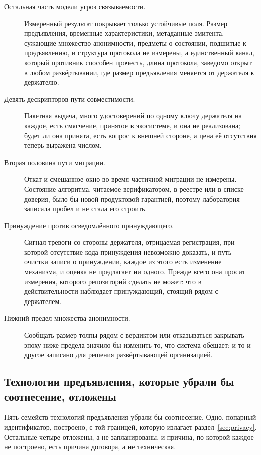 \begin{description}
  \item[Остальная часть модели угроз связываемости.] Измеренный результат покрывает только
    устойчивые поля. Размер предъявления, временные характеристики, метаданные эмитента, сужающие
    множество анонимности, предметы о состоянии, подшитые к предъявлению, и структура протокола не
    измерены, а единственный канал, который противник способен прочесть, длина протокола, заведомо
    открыт в любом развёртывании, где размер предъявления меняется от держателя к держателю.
  \item[Девять дескрипторов пути совместимости.] Пакетная выдача, много удостоверений по одному
    ключу держателя на каждое, есть смягчение, принятое в экосистеме, и она не реализована; будет
    ли она принята, есть вопрос к внешней стороне, а цена её отсутствия теперь выражена числом.
  \item[Вторая половина пути миграции.] Откат и смешанное окно во время частичной миграции не
    измерены. Состояние алгоритма, читаемое верификатором, в реестре или в списке доверия, было бы
    новой продуктовой гарантией, поэтому лаборатория записала пробел и не стала его строить.
  \item[Принуждение против осведомлённого принуждающего.] Сигнал тревоги со стороны держателя,
    отрицаемая регистрация, при которой отсутствие кода принуждения невозможно доказать, и путь
    очистки записи о принуждении, каждое из этого есть изменение механизма, и оценка не предлагает
    ни одного. Прежде всего она просит измерения, которого репозиторий сделать не может: что в
    действительности наблюдает принуждающий, стоящий рядом с держателем.
  \item[Нижний предел множества анонимности.] Сообщать размер толпы рядом с вердиктом
     или отказываться закрывать эпоху ниже предела значило бы изменить то, что
    система обещает; и то и другое записано для решения развёртывающей организацией.
\end{description}

\subsection{Технологии предъявления, которые убрали бы соотнесение, отложены}

Пять семейств технологий предъявления убрали бы соотнесение. Одно, попарный идентификатор, построено, с той границей,
которую излагает раздел~\ref{sec:privacy}. Остальные четыре отложены, а не запланированы, и
причина, по которой каждое не построено, есть причина договора, а не техническая.

